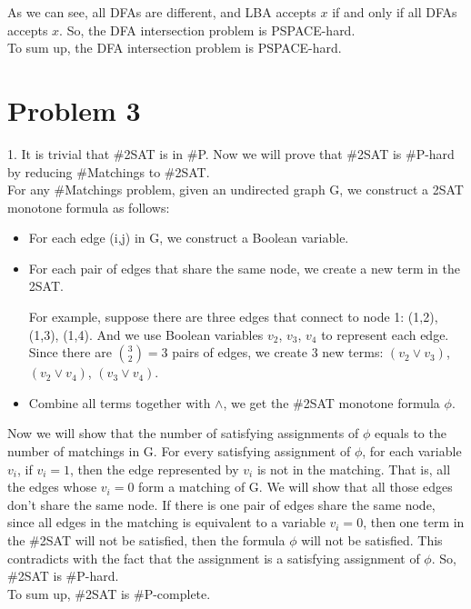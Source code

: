 \documentclass[12pt]{article}
\begin{document}
As we can see, all DFAs are different, and LBA accepts $x$ if and only
if all DFAs accepts $x$. So, the DFA intersection problem is
PSPACE-hard. \\

To sum up, the DFA intersection problem is PSPACE-hard.  

\section*{Problem 3}

1. It is trivial that \#2SAT is in \#P. Now we will prove that \#2SAT is
\#P-hard by reducing \#Matchings to \#2SAT. \\

For any \#Matchings problem, given an undirected graph G, we construct
a 2SAT monotone formula as follows:

\begin{itemize}
\item For each edge (i,j) in G, we construct a Boolean variable.
\item For each pair of edges that share the same node, we create a
  new term in the 2SAT.

  For example, suppose there are three edges that connect to node 1:
  (1,2), (1,3), (1,4). And we use Boolean variables $v_2$, $v_3$,
  $v_4$ to represent each edge. Since there are $\binom {3}{2} = 3$
  pairs of edges, we create 3 new terms: $(v_2 \lor v_3)$, $(v_2 \lor
  v_4)$, $(v_3 \lor v_4)$.
\item Combine all terms together with $\land$, we get the \#2SAT
  monotone formula $\phi$.
\end{itemize}

Now we will show that the number of satisfying assignments of $\phi$
equals to the number of matchings in G. For every satisfying
assignment of $\phi$, for each variable $v_i$, if $v_i = 1$, then the
edge represented by $v_i$ is not in the matching. That is, all the
edges whose $v_i = 0$ form a matching of G. We will show that all
those edges don't share the same node. If there is one pair of
edges share the same node, since all edges in the matching is
equivalent to a variable $v_i = 0$, then one term in the \#2SAT will
not be satisfied, then the formula $\phi$ will not be satisfied. This
contradicts with the fact that the assignment is a satisfying
assignment of $\phi$. So, \#2SAT is \#P-hard. \\

To sum up, \#2SAT is \#P-complete. \\
\end{document}
